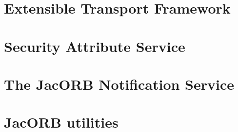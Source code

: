 \documentclass[12pt]{scrbook}
\begin{document}



\chapter{Extensible Transport Framework}
\label{ch:etf}




\chapter{Security Attribute Service}
\label{ch:sas}




\chapter{The JacORB Notification Service}
\label{ch:ntfy}




\chapter{JacORB utilities}
\label{ch:tools}






{


}
\end{document}

